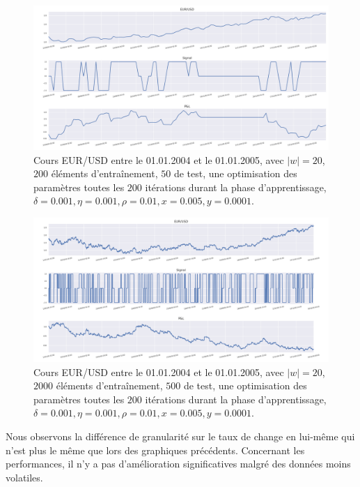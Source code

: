 \documentclass[a4paper, 11pt]{article}
\begin{document}
\begin{figure}
	\centering
	\includegraphics[scale=0.5]{res/eursud_2004-2005-days}
	\caption{Cours EUR/USD entre le 01.01.2004 et le 01.01.2005, avec $|w| = 20$, $200$ éléments d'entraînement, $50$ de test, une optimisation des
		paramètres toutes les $200$ itérations durant la phase d'apprentissage, $\delta = 0.001, \eta=0.001,\rho=0.01, x = 0.005, y=0.0001$.}
\end{figure}

\begin{figure}
	\centering
		\includegraphics[scale=0.5]{res/eursud_2004-2005-hours}
	\caption{Cours EUR/USD entre le 01.01.2004 et le 01.01.2005, avec $|w| = 20$, $2000$ éléments d'entraînement, $500$ de test, une optimisation des
		paramètres toutes les $200$ itérations durant la phase d'apprentissage, $\delta = 0.001, \eta=0.001,\rho=0.01, x = 0.005, y=0.0001$.}
\end{figure}
\clearpage

Nous observons la différence de granularité sur le taux de change en lui-même qui n'est plus le même que lors des graphiques précédents. Concernant les performances, il n'y a pas d'amélioration significatives malgré des données moins volatiles.
\end{document}
